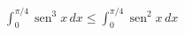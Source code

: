 \item $\displaystyle \int_0^{\pi/4} \operatorname{sen}^3 x \, dx \le \int_0^{\pi/4} \operatorname{sen}^2 x \, dx$
